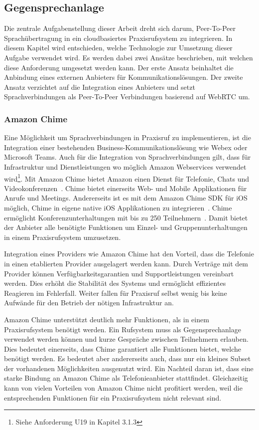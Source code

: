 \subsection{Gegensprechanlage}

Die zentrale Aufgabenstellung dieser Arbeit dreht sich darum, Peer-To-Peer Sprachübertragung in ein cloudbasiertes Praxisrufsystem zu integrieren.
In diesem Kapitel wird entschieden, welche Technologie zur Umsetzung dieser Aufgabe verwendet wird.
Es werden dabei zwei Ansätze beschrieben, mit welchen diese Anforderung umgesetzt werden kann.
Der erste Ansatz beinhaltet die Anbindung eines externen Anbieters für Kommunikationslösungen.
Der zweite Ansatz verzichtet auf die Integration eines Anbieters und setzt Sprachverbindungen als Peer-To-Peer Verbindungen basierend auf WebRTC um.

\subsubsection{Amazon Chime}

Eine Möglichkeit um Sprachverbindungen in Praxisruf zu implementieren, ist die Integration einer bestehenden Business-Kommunikationslösung wie Webex oder Microsoft Teams.
Auch für die Integration von Sprachverbindungen gilt, dass für Infrastruktur und Dienstleistungen wo möglich Amazon Webservices verwendet wird\footnote{Siehe Anforderung U19 in Kapitel 3.1.3}.
Mit Amazon Chime bietet Amazon einen Dienst für Telefonie, Chats und Videokonferenzen~\cite{aws_chime}.
Chime bietet einerseits Web- und Mobile Applikationen für Anrufe und Meetings.
Andererseits ist es mit dem Amazon Chime SDK für iOS möglich, Chime in eigene native iOS Applikationen zu integrieren~\cite{aws_chime_sdk}.
Chime ermöglicht Konferenzunterhaltungen mit bis zu 250 Teilnehmern~\cite{aws_faq}.
Damit bietet der Anbieter alle benötigte Funktionen um Einzel- und Gruppenunterhaltungen in einem Praxisrufsystem umzusetzen.

Integration eines Providers wie Amazon Chime hat den Vorteil, dass die Telefonie in einen etablierten Provider ausgelagert werden kann.
Durch Verträge mit dem Provider können Verfügbarkeitsgarantien und Supportleistungen vereinbart werden.
Dies erhöht die Stabilität des Systems und ermöglicht effizientes Reagieren im Fehlerfall.
Weiter fallen für Praxisruf selbst wenig bis keine Aufwände für den Betrieb der nötigen Infrastruktur an.

Amazon Chime unterstützt deutlich mehr Funktionen, als in einem Praxisrufsystem benötigt werden.
Ein Rufsystem muss als Gegensprechanlage verwendet werden können und kurze Gespräche zwischen Teilnehmern erlauben.
Dies bedeutet einerseits, dass Chime garantiert alle Funktionen bietet, welche benötigt werden.
Es bedeutet aber andererseits auch, dass nur ein kleines Subset der vorhandenen Möglichkeiten ausgenutzt wird.
Ein Nachteil daran ist, dass eine starke Bindung an Amazon Chime als Telefonieanbieter stattfindet.
Gleichzeitig kann von vielen Vorteilen von Amazon Chime nicht profitiert werden, weil die entsprechenden Funktionen für ein Praxisrufsystem nicht relevant sind.

